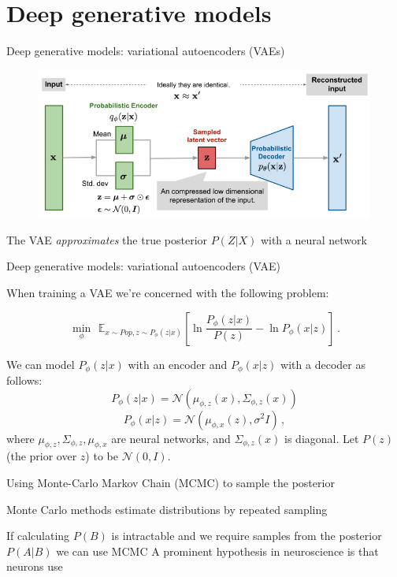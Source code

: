\documentclass[aspectratio=169]{beamer}
\begin{document}
\section{Deep generative models}
\begin{frame}{Deep generative models: variational autoencoders (VAEs)}

\begin{figure}
\includegraphics[width=135mm]{vae-diagram}
\end{figure}

The VAE \emph{approximates} the true posterior $P(Z|X)$ with a neural network

\end{frame}

\begin{frame}{Deep generative models: variational autoencoders (VAE)}

When training a VAE we're concerned with the following problem:

$$\min_{\phi} \,\ \mathbb E_{x \sim Pop, z \sim P_\phi(z|x)} \left[ \ln \frac{P_\phi(z|x)}{P(z)} - \ln P_\phi(x|z) \right] \,.$$

We can model $P_\phi(z|x)$ with an encoder and $P_\phi(x|z)$ with a decoder as follows:
$$P_\phi(z|x) = \mathcal N \left(\mu_{\phi,z}(x), \Sigma_{\phi,z}(x) \right)$$
$$P_\phi(x|z) = \mathcal N \left( \mu_{\phi,x}(z), \sigma^2 I \right) \,,$$
where $\mu_{\phi,z}, \Sigma_{\phi,z}, \mu_{\phi,x}$ are neural networks, and $\Sigma_{\phi,z}(x)$ is diagonal.
\vfill
Let $P(z)$ (the prior over $z$) to be $\mathcal N(0, I)$.


\end{frame}

\begin{frame}{Using Monte-Carlo Markov Chain (MCMC) to sample the posterior}

Monte Carlo methods estimate distributions by repeated sampling

\vfill
If calculating $P(B)$ is intractable and we require samples from the posterior $P(A|B )$ we can use MCMC
\vfill
A prominent hypothesis in neuroscience is that neurons use 

\end{frame}
\end{document}

